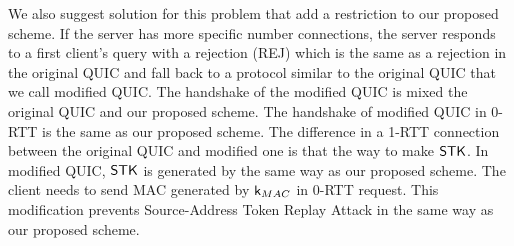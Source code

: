 We also suggest solution for this problem that add a restriction to our
proposed scheme.
If the server has more specific number connections, the server
responds to a first client's query with a rejection (REJ) which
is the same as a rejection in the original QUIC and
fall back to a protocol similar to the original QUIC that we call
modified QUIC.
The handshake of the modified QUIC is mixed the original QUIC and our
proposed scheme.
The handshake of modified QUIC in 0-RTT is the same as our proposed
scheme.
The difference in a 1-RTT connection between the original QUIC and modified one
is that the way to make $\mathsf{STK}$. In modified QUIC, $\mathsf{STK}$ is generated
by the same way as our proposed scheme. The client needs to send
MAC generated by $\mathsf{k}_{MAC}$ in 0-RTT request.
This modification prevents Source-Address Token Replay Attack
in the same way as our proposed scheme.